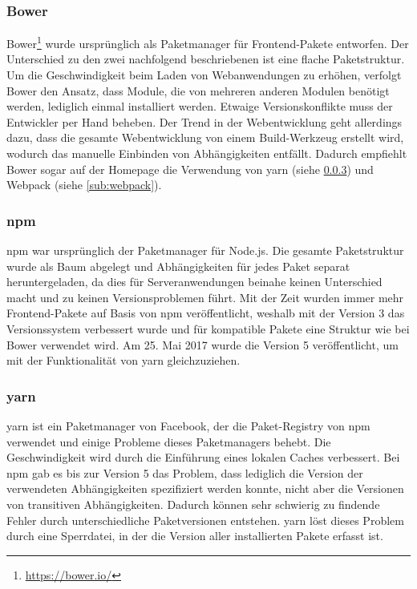 \subsubsection{Bower}
\label{sub:bower}
Bower\footnote{\url{https://bower.io/}} wurde ursprünglich als Paketmanager für Frontend-Pakete entworfen.
Der Unterschied zu den zwei nachfolgend beschriebenen ist eine flache Paketstruktur.
Um die Geschwindigkeit beim Laden von Webanwendungen zu erhöhen, verfolgt Bower den Ansatz, dass Module, die von mehreren anderen Modulen benötigt werden, lediglich einmal installiert werden.
Etwaige Versionskonflikte muss der Entwickler per Hand beheben.
Der Trend in der Webentwicklung geht allerdings dazu, dass die gesamte Webentwicklung von einem Build-Werkzeug erstellt wird, wodurch das manuelle Einbinden von Abhängigkeiten entfällt.
Dadurch empfiehlt Bower sogar auf der Homepage die Verwendung von yarn (siehe \cref{sub:yarn}) und Webpack (siehe \cref{sub:webpack}).

\subsubsection{npm}
\label{sub:npm}
npm war ursprünglich der Paketmanager für Node.js.
Die gesamte Paketstruktur wurde als Baum abgelegt und Abhängigkeiten für jedes Paket separat heruntergeladen, da dies für Serveranwendungen beinahe keinen Unterschied macht und zu keinen Versionsproblemen führt.
Mit der Zeit wurden immer mehr Frontend-Pakete auf Basis von npm veröffentlicht, weshalb mit der Version 3 das Versionssystem verbessert wurde und für kompatible Pakete eine Struktur wie bei Bower verwendet wird.
Am 25. Mai 2017 wurde die Version 5 veröffentlicht, um mit der Funktionalität von yarn gleichzuziehen.

\subsubsection{yarn}
\label{sub:yarn}
yarn ist ein Paketmanager von Facebook, der die Paket-Registry von npm verwendet und einige Probleme dieses Paketmanagers behebt.
Die Geschwindigkeit wird durch die Einführung eines lokalen Caches verbessert.
Bei npm gab es bis zur Version 5 das Problem, dass lediglich die Version der verwendeten Abhängigkeiten spezifiziert werden konnte, nicht aber die Versionen von transitiven Abhängigkeiten.
Dadurch können sehr schwierig zu findende Fehler durch unterschiedliche Paketversionen entstehen.
yarn löst dieses Problem durch eine Sperrdatei, in der die Version aller installierten Pakete erfasst ist.

